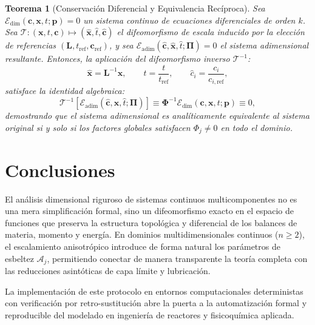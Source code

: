 \documentclass[11pt,a4paper]{article}
\newtheorem{teorema}{Teorema}
\begin{document}
\begin{teorema}[Conservación Diferencial y Equivalencia Recíproca]
Sea $\mathcal{E}_{\mathrm{dim}}(\mathbf{c}, \mathbf{x}, t; \mathbf{p}) = 0$ un sistema continuo de ecuaciones diferenciales de orden $k$. Sea $\mathcal{T}: (\mathbf{x}, t, \mathbf{c}) \mapsto (\hat{\mathbf{x}}, \hat{t}, \hat{\mathbf{c}})$ el difeomorfismo de escala inducido por la elección de referencias $(\mathbf{L}, t_{\mathrm{ref}}, \mathbf{c}_{\mathrm{ref}})$, y sea $\mathcal{E}_{\mathrm{adim}}(\hat{\mathbf{c}}, \hat{\mathbf{x}}, \hat{t}; \boldsymbol{\Pi}) = 0$ el sistema adimensional resultante.
Entonces, la aplicación del difeomorfismo inverso $\mathcal{T}^{-1}$:
\begin{equation}
\hat{\mathbf{x}} = \mathbf{L}^{-1} \mathbf{x}, \qquad \hat{t} = \frac{t}{t_{\mathrm{ref}}}, \qquad \hat{c}_i = \frac{c_i}{c_{i,\mathrm{ref}}},
\end{equation}
satisface la identidad algebraica:
\begin{equation}
\mathcal{T}^{-1} \left[ \mathcal{E}_{\mathrm{adim}}(\hat{\mathbf{c}}, \hat{\mathbf{x}}, \hat{t}; \boldsymbol{\Pi}) \right] \equiv \boldsymbol{\Phi}^{-1} \mathcal{E}_{\mathrm{dim}}(\mathbf{c}, \mathbf{x}, t; \mathbf{p}) \equiv 0,
\end{equation}
demostrando que el sistema adimensional es analíticamente equivalente al sistema original si y solo si los factores globales satisfacen $\Phi_j \ne 0$ en todo el dominio.
\end{teorema}

\section{Conclusiones}
El análisis dimensional riguroso de sistemas continuos multicomponentes no es una mera simplificación formal, sino un difeomorfismo exacto en el espacio de funciones que preserva la estructura topológica y diferencial de los balances de materia, momento y energía. En dominios multidimensionales continuos ($n \ge 2$), el escalamiento anisotrópico introduce de forma natural los parámetros de esbeltez $\mathcal{A}_j$, permitiendo conectar de manera transparente la teoría completa con las reducciones asintóticas de capa límite y lubricación. 

La implementación de este protocolo en entornos computacionales deterministas con verificación por retro-sustitución abre la puerta a la automatización formal y reproducible del modelado en ingeniería de reactores y fisicoquímica aplicada.
\end{document}
